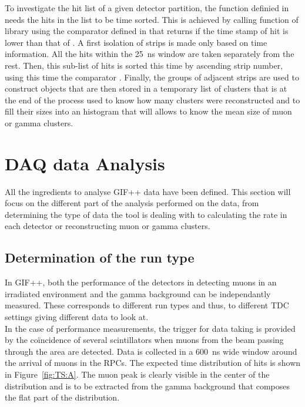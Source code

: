 	To investigate the hit list of a given detector partition, the function  definied in  needs the hits in the list to be time sorted. This is achieved by calling function  of library  using the comparator  defined in  that returns  if the time stamp of hit  is lower than that of . A first isolation of strips is made only based on time information. All the hits within the \SI{25}{ns} window are taken separately from the rest. Then, this sub-list of hits is sorted this time by ascending strip number, using this time the comparator . Finally, the groups of adjacent strips are used to construct  objects that are then stored in a temporary list of clusters that is at the end of the process used to know how many clusters were reconstructed and to fill their sizes into an histogram that will allows to know the mean size of muon or gamma clusters.\\
	
\section{DAQ data Analysis}
\label{app2:sec:analysis}

	All the ingredients to analyse GIF++ data have been defined. This section will focus on the different part of the analysis performed on the data, from determining the type of data the tool is dealing with to calculating the rate in each detector or reconstructing muon or gamma clusters.

	\subsection{Determination of the run type}
	\label{app2:ssec:runtype}
	
	In GIF++, both the performance of the detectors in detecting muons in an irradiated environment and the gamma background can be independantly measured. These corresponds to different run types and thus, to different TDC settings giving different data to look at.\\
	
	In the case of performance measurements, the trigger for data taking is provided by the coïncidence of several scintillators when muons from the beam passing through the area are detected. Data is collected in a \SI{600}{ns} wide window around the arrival of muons in the RPCs. The expected time distribution of hits is shown in Figure~\ref{fig:TS:A}. The muon peak is clearly visible in the center of the distribution and is to be extracted from the gamma background that composes the flat part of the distribution.
	
